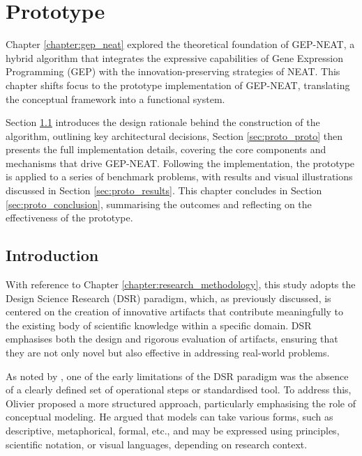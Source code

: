 \chapter{Prototype}
Chapter \ref{chapter:gep_neat} explored the theoretical foundation of GEP-NEAT, a hybrid algorithm that integrates the expressive capabilities of Gene Expression Programming (GEP) with the innovation-preserving strategies of NEAT. This chapter shifts focus to the prototype implementation of GEP-NEAT, translating the conceptual framework into a functional system.

\parbreak\noindent Section \ref{sec:proto_introduction} introduces the design rationale behind the construction of the algorithm, outlining key architectural decisions, Section \ref{sec:proto_proto} then presents the full implementation details, covering the core components and mechanisms that drive GEP-NEAT. Following the implementation, the prototype is applied to a series of benchmark problems, with results and visual illustrations discussed in Section \ref{sec:proto_results}. This chapter concludes in Section \ref{sec:proto_conclusion}, summarising the outcomes and reflecting on the effectiveness of the prototype.

\section{Introduction}\label{sec:proto_introduction}
With reference to Chapter \ref{chapter:research_methodology}, this study adopts the Design Science Research (DSR) paradigm, which, as previously discussed, is centered on the creation of innovative artifacts that contribute meaningfully to the existing body of scientific knowledge within a specific domain. DSR emphasises both the design and rigorous evaluation of artifacts, ensuring that they are not only novel but also effective in addressing real-world problems.

\parbreak\noindent As noted by \cite{olivier2009information}, one of the early limitations of the DSR paradigm was the absence of a clearly defined set of operational steps or standardised tool. To address this, Olivier proposed a more structured approach, particularly emphasising the role of conceptual modeling. He argued that models can take various forms, such as descriptive, metaphorical, formal, etc., and may be expressed using principles, scientific notation, or visual languages, depending on research context.

